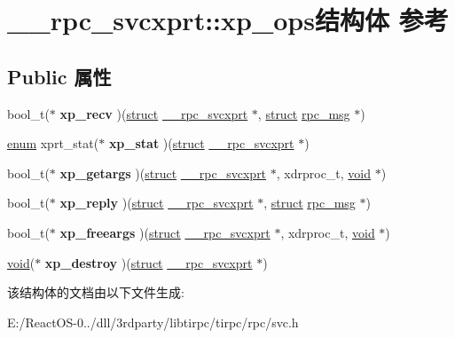 \hypertarget{struct____rpc__svcxprt_1_1xp__ops}{}\section{\+\_\+\+\_\+rpc\+\_\+svcxprt\+:\+:xp\+\_\+ops结构体 参考}
\label{struct____rpc__svcxprt_1_1xp__ops}
\subsection*{Public 属性}
\begin{DoxyCompactItemize}
\item 
\mbox{\label{struct____rpc__svcxprt_1_1xp__ops_a3e2ee2f43ff8c4e9ca12fb8a0573ba1d}} 
bool\+\_\+t($\ast$ {\bfseries xp\+\_\+recv} )(\hyperlink{interfacestruct}{struct} \hyperlink{struct____rpc__svcxprt}{\+\_\+\+\_\+rpc\+\_\+svcxprt} $\ast$, \hyperlink{interfacestruct}{struct} \hyperlink{structrpc__msg}{rpc\+\_\+msg} $\ast$)
\item 
\mbox{\label{struct____rpc__svcxprt_1_1xp__ops_a8358331b37e8f3ae19afd22a9793c2b7}} 
\hyperlink{interfaceenum}{enum} xprt\+\_\+stat($\ast$ {\bfseries xp\+\_\+stat} )(\hyperlink{interfacestruct}{struct} \hyperlink{struct____rpc__svcxprt}{\+\_\+\+\_\+rpc\+\_\+svcxprt} $\ast$)
\item 
\mbox{\label{struct____rpc__svcxprt_1_1xp__ops_a44e086bceb24d2dedd0e28759a97acde}} 
bool\+\_\+t($\ast$ {\bfseries xp\+\_\+getargs} )(\hyperlink{interfacestruct}{struct} \hyperlink{struct____rpc__svcxprt}{\+\_\+\+\_\+rpc\+\_\+svcxprt} $\ast$, xdrproc\+\_\+t, \hyperlink{interfacevoid}{void} $\ast$)
\item 
\mbox{\label{struct____rpc__svcxprt_1_1xp__ops_ae161eb0d60393e6a64b569a12c988625}} 
bool\+\_\+t($\ast$ {\bfseries xp\+\_\+reply} )(\hyperlink{interfacestruct}{struct} \hyperlink{struct____rpc__svcxprt}{\+\_\+\+\_\+rpc\+\_\+svcxprt} $\ast$, \hyperlink{interfacestruct}{struct} \hyperlink{structrpc__msg}{rpc\+\_\+msg} $\ast$)
\item 
\mbox{\label{struct____rpc__svcxprt_1_1xp__ops_af8767eeabd65eaf9939fbb5a8ee1ca8a}} 
bool\+\_\+t($\ast$ {\bfseries xp\+\_\+freeargs} )(\hyperlink{interfacestruct}{struct} \hyperlink{struct____rpc__svcxprt}{\+\_\+\+\_\+rpc\+\_\+svcxprt} $\ast$, xdrproc\+\_\+t, \hyperlink{interfacevoid}{void} $\ast$)
\item 
\mbox{\label{struct____rpc__svcxprt_1_1xp__ops_aae5e4ab3fb6a6495a7a22c83536ef575}} 
\hyperlink{interfacevoid}{void}($\ast$ {\bfseries xp\+\_\+destroy} )(\hyperlink{interfacestruct}{struct} \hyperlink{struct____rpc__svcxprt}{\+\_\+\+\_\+rpc\+\_\+svcxprt} $\ast$)
\end{DoxyCompactItemize}


该结构体的文档由以下文件生成\+:\begin{DoxyCompactItemize}
\item 
E\+:/\+React\+O\+S-\/0../dll/3rdparty/libtirpc/tirpc/rpc/svc.\+h\end{DoxyCompactItemize}
